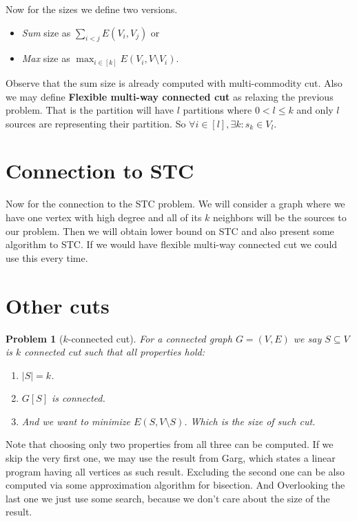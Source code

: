 \documentclass{article}
\theoremstyle{plain}
\theoremstyle{plain}
\newtheorem{problem}{Problem}
\theoremstyle{remark}
\begin{document}
	Now for the sizes we define two versions.
	
	\begin{itemize}
		\item \textit{Sum} size as $\sum_{i < j} E(V_i, V_j)$ or
		\item \textit{Max} size as $\max_{i \in[k]} E(V_i, V \setminus V_i)$.
	\end{itemize}
	
	Observe that the sum size is already computed with multi-commodity cut. Also we may define \textbf{Flexible multi-way connected cut} as relaxing the previous problem. That is the partition will have $l$ partitions where $0 < l \leq k$ and only $l$ sources are representing their partition. So $\forall i \in [l] , \exists k : s_k \in V_l$.
	
	\section{Connection to STC}
	
	Now for the connection to the STC problem. We will consider a graph where we have one vertex with high degree and all of its $k$ neighbors will be the sources to our problem. Then we will obtain lower bound on STC and also present some algorithm to STC. If we would have flexible multi-way connected cut we could use this every time.
	
	\section{Other cuts}
	
	\begin{problem}[$k$-connected cut]
		For a connected graph $G = (V,E)$ we say $S \subseteq V$ is \textit{$k$ connected cut} such that all properties hold:
		
		\begin{enumerate}
			\item $|S| = k$.
			\item $G[S]$ is connected. %
			\item And we want to minimize $E(S, V \setminus S)$. Which is the size of such cut.
		\end{enumerate}
	\end{problem}
	
	
	Note that choosing only two properties from all three can be computed. If we skip the very first one, we may use the result from Garg, which states a linear program having all vertices as such result. Excluding the second one can be also computed via some approximation algorithm for bisection. And Overlooking the last one we just use some search, because we don't care about the size of the result.
	
\end{document}

